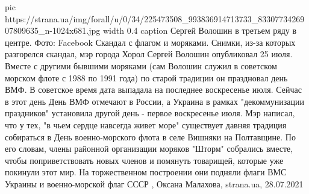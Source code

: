 \ifcmt
  pic https://strana.ua/img/forall/u/0/34/225473508_993836914713733_8330773426907809635_n-1024x681.jpg
  width 0.4
	caption Сергей Волошин в третьем ряду в центре. Фото: Facebook
\fi
Скандал с флагом и моряками.  Снимки, из-за которых разгорелся скандал, мэр
города Хорол Сергей Волошин опубликовал 25 июля. Вместе с другими бывшими
моряками (сам Волошин служил в советском морском флоте с 1988 по 1991 года) по
старой традиции он праздновал день ВМФ.  В советское время дата выпадала на
последнее воскресенье июля. Сейчас в этот день День ВМФ отмечают в России, а
Украина в рамках "декоммунизации праздников" установила другой день - первое
воскресенье июля.  Мэр написал, что у тех, "в чьем сердце навсегда живет море"
существует давняя традиция собираться в День военно-морского флота в селе
Вишняки на Полтавщине.  По его словам, члены районной организации моряков
"Шторм" собрались вместе, чтобы поприветствовать новых членов и помянуть
товарищей, которые уже покинули этот мир.  На торжественном построении они
подняли флаги ВМС Украины и военно-морской флаг СССР
, 
Оксана Малахова, strana.ua, 28.07.2021

